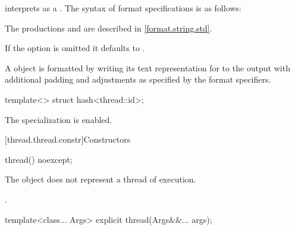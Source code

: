 \begin{itemdescr}
\pnum
{} interprets 
as a .
The syntax of format specifications is as follows:

\begin{ncbnf}
\br
     
\end{ncbnf}

\begin{note}
The productions  and 
are described in \ref{format.string.std}.
\end{note}

\pnum
If the  option is omitted it defaults to \tcode{>}.

\pnum
A  object is formatted by
writing its text representation for  to the output
with additional padding and adjustments as specified by the format specifiers.
\end{itemdescr}

%
\begin{itemdecl}
template<> struct hash<thread::id>;
\end{itemdecl}

\begin{itemdescr}
\pnum
The specialization is enabled.
\end{itemdescr}

[thread.thread.constr]{Constructors}

%
\begin{itemdecl}
thread() noexcept;
\end{itemdecl}

\begin{itemdescr}
\pnum
\effects
The object does not represent a thread of execution.

\pnum
\ensures
{}.
\end{itemdescr}

%
\begin{itemdecl}
template<class... Args> explicit thread(Args&&... args);
\end{itemdecl}

